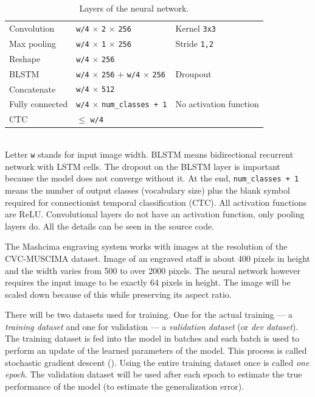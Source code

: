\begin{table}[h]
\begin{tabular}{lll}
Convolution & \texttt{w/4} $\times$ \texttt{2} $\times$ \texttt{256} & Kernel \texttt{3x3} \\
Max pooling & \texttt{w/4} $\times$ \texttt{1} $\times$ \texttt{256} & Stride \texttt{1,2} \\
\midrule
Reshape & \texttt{w/4} $\times$ \texttt{256} & \\
BLSTM & \texttt{w/4} $\times$ \texttt{256} $+$ \texttt{w/4} $\times$ \texttt{256} & Droupout \\
Concatenate & \texttt{w/4} $\times$ \texttt{512} & \\
\midrule
Fully connected & \texttt{w/4} $\times$ \verb`num_classes + 1` & No activation function \\
CTC & $\leq$ \texttt{w/4} & \\
\bottomrule
\end{tabular}
\\
\medskip
\small
Letter \texttt{w} stands for input image width. BLSTM means bidirectional recurrent network with LSTM cells. The dropout on the BLSTM layer is important because the model does not converge without it. At the end, \verb`num_classes + 1` means the number of output classes (vocabulary size) plus the blank symbol required for connectionist temporal classification (CTC). All activation functions are ReLU. Convolutional layers do not have an activation function, only pooling layers do. All the details can be  seen in the source code.
\caption{Layers of the neural network. }
\label{tab6:NetworkLayers}
\end{table}

The Mashcima engraving system works with images at the resolution of the CVC-MUSCIMA dataset. Image of an engraved staff is about 400 pixels in height and the width varies from 500 to over 2000 pixels. The neural network however requires the input image to be exactly 64 pixels in height. The image will be scaled down because of this while preserving its aspect ratio.

There will be two datasets used for training. One for the actual training --- a \emph{training dataset} and one for validation --- a \emph{validation dataset} (or \emph{dev dataset}). The training dataset is fed into the model in batches and each batch is used to perform an update of the learned parameters of the model. This process is called stochastic gradient descent (\cite{Goodfellow-et-al-2016}). Using the entire training dataset once is called \emph{one epoch}. The validation dataset will be used after each epoch to estimate the true performance of the model (to estimate the generalization error).

